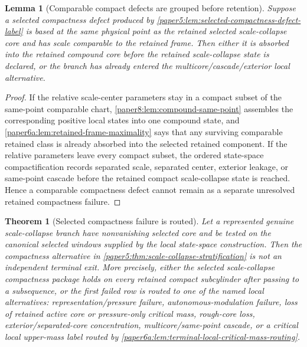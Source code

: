 \documentclass[11pt]{amsart}
\theoremstyle{plain}
\newtheorem{theorem}{Theorem}[section]
\newtheorem{lemma}[lemma]{Lemma}
\theoremstyle{definition}
\theoremstyle{remark}
\begin{document}
\begin{lemma}[Comparable compact defects are grouped before retention]
\label{paper5:lem:selected-compactness-comparable-defect}
Suppose a selected compactness defect produced by
\cref{paper5:lem:selected-compactness-defect-label} is based at the same
physical point as the retained selected scale-collapse core and has scale
comparable to the retained frame.  Then either it is absorbed into the retained
compound core before the retained scale-collapse state is declared, or the
branch has already entered the multicore/cascade/exterior local alternative.
\end{lemma}

\begin{proof}
If the relative scale-center parameters stay in a compact subset of the
same-point comparable chart, \cref{paper8:lem:compound-same-point} assembles
the corresponding positive local states into one compound state, and
\cref{paper6a:lem:retained-frame-maximality} says that any surviving comparable
retained class is already absorbed into the selected retained component.  If
the relative parameters leave every compact subset, the ordered state-space
compactification records separated scale, separated center, exterior leakage,
or same-point cascade before the retained compact scale-collapse state is
reached.  Hence a comparable compactness defect cannot remain as a separate
unresolved retained compactness failure.
\end{proof}

\begin{theorem}[Selected compactness failure is routed]
\label{paper5:thm:selected-compactness-failure-routed}
Let a represented genuine scale-collapse branch have nonvanishing selected
core and be tested on the canonical selected windows supplied by the local
state-space construction.  Then the compactness alternative in
\cref{paper5:thm:scale-collapse-stratification} is not an independent terminal
exit.  More precisely, either the selected scale-collapse compactness package
holds on every retained compact subcylinder after passing to a subsequence, or
the first failed row is routed to one of the named local alternatives:
representation/pressure failure, autonomous-modulation failure, loss of
retained active core or pressure-only critical mass, rough-core loss,
exterior/separated-core concentration, multicore/same-point cascade, or a
critical local upper-mass label routed by
\cref{paper6a:lem:terminal-local-critical-mass-routing}.
\end{theorem}
\end{document}
